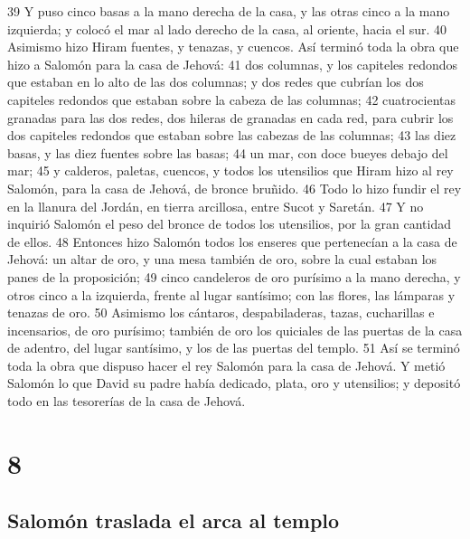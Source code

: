 39 Y puso cinco basas a la mano derecha de la casa, y las otras cinco a la mano izquierda; y colocó el mar al lado derecho de la casa, al oriente, hacia el sur.
40 Asimismo hizo Hiram fuentes, y tenazas, y cuencos. Así terminó toda la obra que hizo a Salomón para la casa de Jehová:
41 dos columnas, y los capiteles redondos que estaban en lo alto de las dos columnas; y dos redes que cubrían los dos capiteles redondos que estaban sobre la cabeza de las columnas;
42 cuatrocientas granadas para las dos redes, dos hileras de granadas en cada red, para cubrir los dos capiteles redondos que estaban sobre las cabezas de las columnas;
43 las diez basas, y las diez fuentes sobre las basas;
44 un mar, con doce bueyes debajo del mar;
45 y calderos, paletas, cuencos, y todos los utensilios que Hiram hizo al rey Salomón, para la casa de Jehová, de bronce bruñido.
46 Todo lo hizo fundir el rey en la llanura del Jordán, en tierra arcillosa, entre Sucot y Saretán.
47 Y no inquirió Salomón el peso del bronce de todos los utensilios, por la gran cantidad de ellos.
48 Entonces hizo Salomón todos los enseres que pertenecían a la casa de Jehová: un altar de oro, y una mesa también de oro, sobre la cual estaban los panes de la proposición;
49 cinco candeleros de oro purísimo a la mano derecha, y otros cinco a la izquierda, frente al lugar santísimo; con las flores, las lámparas y tenazas de oro.
50 Asimismo los cántaros, despabiladeras, tazas, cucharillas e incensarios, de oro purísimo; también de oro los quiciales de las puertas de la casa de adentro, del lugar santísimo, y los de las puertas del templo.
51 Así se terminó toda la obra que dispuso hacer el rey Salomón para la casa de Jehová. Y metió Salomón lo que David su padre había dedicado,  plata, oro y utensilios; y depositó todo en las tesorerías de la casa de Jehová.

\chapter{8}

\section*{Salomón traslada el arca al templo}

 

